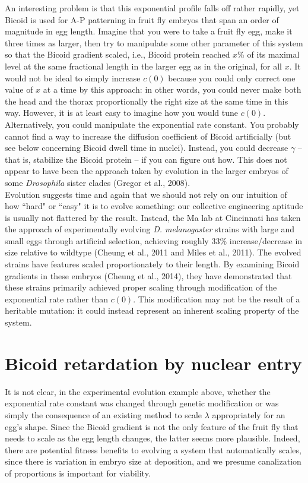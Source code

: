 \documentclass{article}
\begin{document}
An interesting problem is that this exponential profile falls off rather rapidly, yet Bicoid is used for A-P patterning in fruit fly embryos that span an order of magnitude in egg length. Imagine that you were to take a fruit fly egg, make it three times as larger, then try to manipulate some other parameter of this system so that the Bicoid gradient scaled, i.e., Bicoid protein reached $x$\% of its maximal level at the same fractional length in the larger egg as in the original, for all $x$. It would not be ideal to simply increase $c(0)$ because you could only correct one value of $x$ at a time by this approach: in other words, you could never make both the head and the thorax proportionally the right size at the same time in this way. However, it is at least easy to imagine how you would tune $c(0)$. Alternatively, you could manipulate the exponential rate constant. You probably cannot find a way to increase the diffusion coefficient of Bicoid artificially (but see below concerning Bicoid dwell time in nuclei). Instead, you could decrease $\gamma$ -- that is, stabilize the Bicoid protein -- if you can figure out how. This does not appear to have been the approach taken by evolution in the larger embryos of some \textit{Drosophila} sister clades (Gregor et al., 2008). \\

Evolution suggests time and again that we should not rely on our intuition of how ``hard" or ``easy" it is to evolve something: our collective engineering aptitude is usually not flattered by the result. Instead, the Ma lab at Cincinnati has taken the approach of experimentally evolving \textit{D. melanogaster} strains with large and small eggs through artificial selection, achieving roughly 33\% increase/decrease in size relative to wildtype (Cheung et al., 2011 and Miles et al., 2011). The evolved strains have features scaled proportionately to their length. By examining Bicoid gradients in these embryos (Cheung et al., 2014), they have demonstrated that these strains primarily achieved proper scaling through modification of the exponential rate rather than $c(0)$. This modification may not be the result of a heritable mutation: it could instead represent an inherent scaling property of the system.

\section*{Bicoid retardation by nuclear entry}

It is not clear, in the experimental evolution example above, whether the exponential rate constant was changed through genetic modification or was simply the consequence of an existing method to scale $\lambda$ appropriately for an egg's shape. Since the Bicoid gradient is not the only feature of the fruit fly that needs to scale as the egg length changes, the latter seems more plausible. Indeed, there are potential fitness benefits to evolving a system that automatically scales, since there is variation in embryo size at deposition, and we presume canalization of proportions is important for viability.\\
\end{document}
